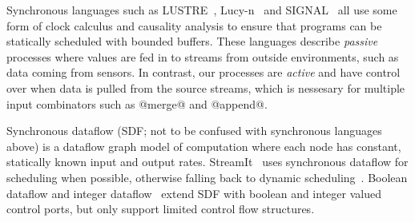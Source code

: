 

Synchronous languages such as LUSTRE~\cite{halbwachs1991synchronous}, Lucy-n~\cite{mandel2010lucy} and SIGNAL~\cite{le2003polychrony} all use some form of clock calculus and causality analysis to ensure that programs can be statically scheduled with bounded buffers. These languages describe \emph{passive} processes where values are fed in to streams from outside environments, such as data coming from sensors. In contrast, our processes are \emph{active} and have control over when data is pulled from the source streams, which is nessesary for multiple input combinators such as @merge@ and  @append@.




Synchronous dataflow (SDF; not to be confused with synchronous languages above) is a dataflow graph model of computation where each node has constant, statically known input and output rates. StreamIt~\cite{thies2002streamit} uses synchronous dataflow for scheduling when possible, otherwise falling back to dynamic scheduling~\cite{soule2013dynamic}. Boolean dataflow and integer dataflow~\cite{buck1993scheduling,buck1994static} extend SDF with boolean and integer valued control ports, but only support limited control flow structures.




